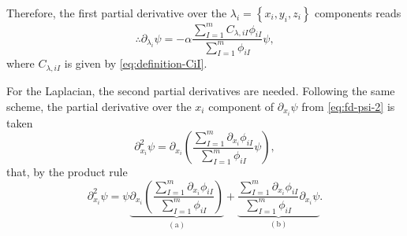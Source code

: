 Therefore, the first partial derivative over the 
$\lambda_i = \left\{ x_i, y_i, z_i \right\}$
components reads
\begin{equation} \label{eq:partial-psi-lambda}
    \therefore
    \partial_{\lambda_i} \psi 
    =
    -\alpha
    \frac{
        \sum_{I=1}^{m} 
        C_{\lambda,iI}
        \phi_{iI} 
    }{
        \sum_{I=1}^{m} \phi_{iI}
    }
    \psi
    ,
\end{equation}
where $C_{\lambda,iI}$ is given by \cref{eq:definition-CiI}.

For the Laplacian, the second partial derivatives are needed.
Following the same scheme, the partial derivative over the $x_i$ component of
$\partial_{x_i} \psi$ from  \cref{eq:fd-psi-2} is taken 
\begin{equation}
    \partial_{x_i}^{2} \psi =
    \partial_{x_i}
    \left(
        \frac{
            \sum_{I=1}^{m} \partial_{x_i} \phi_{iI}
        }{
            \sum_{I=1}^{m} \phi_{iI}
        }
        \psi
    \right)
    ,
\end{equation}
that, by the product rule
\begin{equation} \label{eq:sd-psi-1}
    \partial_{x_i}^{2} \psi =
    \psi
    \underbrace{
        \partial_{x_i}
        \left( 
            \frac{
                \sum_{I=1}^{m} \partial_{x_i} \phi_{iI}
            }{
                \sum_{I=1}^{m} \phi_{iI}
            }
        \right)
    }_{\left( \mathrm{a} \right)}
    +
    \underbrace{
        \frac{
            \sum_{I=1}^{m} \partial_{x_i} \phi_{iI}
        }{
            \sum_{I=1}^{m} \phi_{iI}
        }
        \partial_{x_i}
        \psi
    }_{\left( \mathrm{b} \right)}
    .
\end{equation}

